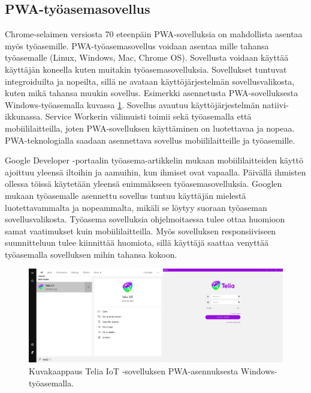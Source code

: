 \documentclass{tktltiki}
\begin{document}
\clearpage

\subsection{PWA-työasemasovellus} 

Chrome-selaimen versiosta 70 eteenpäin PWA-sovelluksia on mahdollista asentaa myös työasemille. PWA-työasemasovellus voidaan asentaa mille tahansa työasemalle (Linux, Windows, Mac, Chrome OS). Sovellusta voidaan käyttää käyttäjän koneella kuten muitakin työasemasovelluksia. Sovellukset tuntuvat integroiduilta ja nopeilta, sillä ne avataan käyttöjärjestelmän sovellusvalikosta, kuten mikä tahansa muukin sovellus. Esimerkki asennetusta PWA-sovelluksesta Windows-työasemalla kuvassa \ref{teliaiot_windowsissa_asennettuna}. Sovellus avautuu käyttöjärjestelmän natiivi-ikkunassa. Service Workerin välimuisti toimii sekä työasemalla että mobiililaitteilla, joten PWA-sovelluksen käyttäminen on luotettavaa ja nopeaa. PWA-teknologialla saadaan asennettava sovellus mobiililaitteille ja työasemille.

Google Developer -portaalin työasema-artikkelin mukaan \cite{Google} mobiililaitteiden käyttö ajoittuu yleensä iltoihin ja aamuihin, kun ihmiset ovat vapaalla. Päivällä ihmisten ollessa töissä käytetään yleensä enimmäkseen työasemasovelluksia. Googlen mukaan työasemalle asennettu sovellus tuntuu käyttäjän mielestä luotettavammalta ja nopeammalta, mikäli se löytyy suoraan työaseman sovellusvalikosta. Työasema sovelluksia ohjelmoitaessa tulee ottaa huomioon samat vaatimukset kuin mobiililaitteilla. Myös sovelluksen responsiiviseen suunnitteluun tulee kiinnittää huomiota, sillä käyttäjä saattaa venyttää työasemalla sovelluksen mihin tahansa kokoon.

\begin{figure}[h]
  \centering
      \includegraphics[width=1.0\textwidth]{teliaiot_desktop_installation1.png}
  \caption{Kuvakaappaus Telia IoT -sovelluksen PWA-asennuksesta Windows-työasemalla.}
  \label{teliaiot_windowsissa_asennettuna}
\end{figure}
\end{document}
